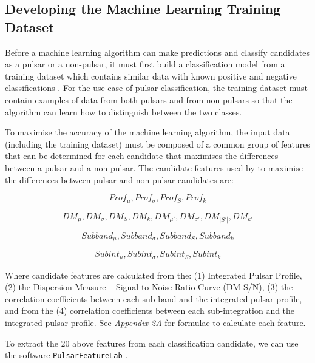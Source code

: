 \documentclass{article}
\begin{document}
\subsection{Developing the Machine Learning Training Dataset}

Before a machine learning algorithm can make predictions and classify candidates as a pulsar or a non-pulsar, it must first build a classification model from a training dataset which contains similar data with known positive and negative classifications \autocite{tan, lyon}. For the use case of pulsar classification, the training dataset must contain examples of data from both pulsars and from non-pulsars so that the algorithm can learn how to distinguish between the two classes.

To maximise the accuracy of the machine learning algorithm, the input data (including the training dataset) must be composed of a common group of features that can be determined for each candidate that maximises the differences between a pulsar and a non-pulsar. The candidate features used by \smartcite{tan} to maximise the differences between pulsar and non-pulsar candidates are:

\begin{equation}
    Prof_{\mu}, Prof_{\sigma}, Prof_{S}, Prof_{k}
\end{equation}

\begin{equation}
    DM_{\mu}, DM_{\sigma}, DM_{S},DM_{k},
    DM_{\mu'}, DM_{\sigma'}, DM_{|S'|},DM_{k'}
\end{equation}

\begin{equation}
    Subband_{\mu}, Subband_{\sigma}, Subband_{S}, Subband_{k}
\end{equation}

\begin{equation}
    Subint_{\mu}, Subint_{\sigma}, Subint_{S}, Subint_{k}
\end{equation}

Where candidate features are calculated from the: (1) Integrated Pulsar Profile, (2) the Dispersion Measure -- Signal-to-Noise Ratio Curve (DM-S/N), (3) the correlation coefficients between each sub-band and the integrated pulsar profile, and from the (4) correlation coefficients between each sub-integration and the integrated pulsar profile. See \emph{Appendix 2A} for formulae to calculate each feature.

To extract the 20 above features from each classification candidate, we can use the software 
\verb|PulsarFeatureLab| \autocite{lyon}.
\end{document}
